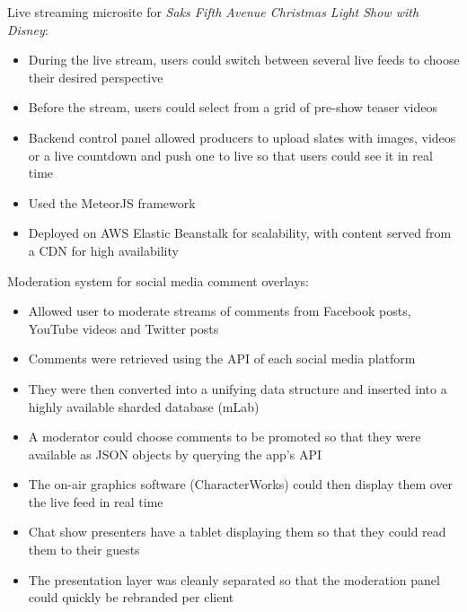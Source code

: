 \item Live streaming microsite for \textit{Saks Fifth Avenue Christmas Light Show with Disney}:
    \begin{itemize}%
        \item During the live stream, users could switch between several live feeds to choose their desired perspective
        \item Before the stream, users could select from a grid of pre-show teaser videos
        \item Backend control panel allowed producers to upload slates with images, videos or a live countdown and push one to live so that users could see it in real time
        \item Used the MeteorJS framework
        \item Deployed on AWS Elastic Beanstalk for scalability, with content served from a CDN for high availability
    \end{itemize}
\item Moderation system for social media comment overlays:
    \begin{itemize}
        \item Allowed user to moderate streams of comments from Facebook posts, YouTube videos and Twitter posts
        \item Comments were retrieved using the API of each social media platform
        \item They were then converted into a unifying data structure and inserted into a highly available sharded database (mLab)
        \item A moderator could choose comments to be promoted so that they were available as JSON objects by querying the app's API
        \item The on-air graphics software (CharacterWorks) could then display them over the live feed in real time
        \item Chat show presenters have a tablet displaying them so that they could read them to their guests
        \item The presentation layer was cleanly separated so that the moderation panel could quickly be rebranded per client
    \end{itemize}
